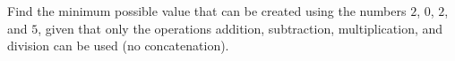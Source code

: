 Find the minimum possible value that can be created using the numbers $2$, $0$, $2$, and $5$, given that only the operations addition, subtraction, multiplication, and division can be used (no concatenation).
